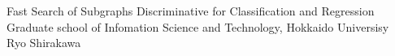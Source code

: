 \documentclass[a4j,11pt]{article}
\begin{document}
\begin{titlepage}
 \setcounter{page}{0}
  \begin{center}
   \vspace*{2.0cm}
   \LARGE
   Fast Search of Subgraphs Discriminative for Classification and Regression
   \\
   \vfill
   \LARGE
   Graduate school of Infomation Science and Technology, Hokkaido Universisy\\
   \vspace{2ex}
   Ryo Shirakawa\\
   \vspace{2ex}
   \vspace*{2cm}
  \end{center}
\end{titlepage}
\tableofcontents \thispagestyle{empty}
 \newpage
 \listoffigures

 \listoftables
 \clearpage 
 \pagestyle{plain} 


\begin{abstract}

\end{abstract}









%



\small
\appendix

\end{document}
